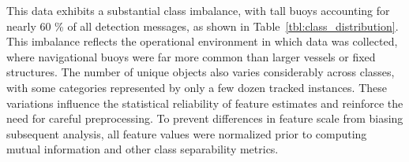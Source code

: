 \documentclass{erauthesis}
\begin{document}





This data exhibits a substantial class imbalance, with tall buoys accounting for nearly 60 \% of all detection messages, as shown in Table~\ref{tbl:class_distribution}. 
This imbalance reflects the operational environment in which data was collected, where navigational buoys were far more common than larger vessels or fixed structures. 
The number of unique objects also varies considerably across classes, with some categories represented by only a few dozen tracked instances. 
These variations influence the statistical reliability of feature estimates and reinforce the need for careful preprocessing. 
To prevent differences in feature scale from biasing subsequent analysis, all feature values were normalized prior to computing mutual information and other class separability metrics.
\end{document}
